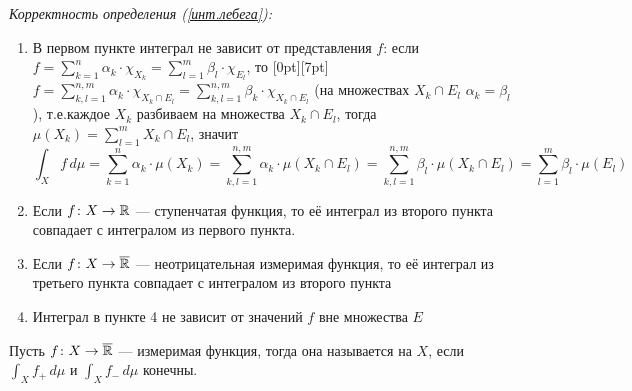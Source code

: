 \begin{zam} \textit{Корректность определения (\ref{инт.лебега}): } 
	\begin{enumerate}\makeatletter\renewcommand{\p@enumi}{\thezam.}\makeatother
		\item В первом пункте интеграл не зависит от представления $f$: если $f = \sum\limits_{k = 1}^n \alpha_k \cdot \chi_{X_k} = \sum\limits_{l = 1}^m \beta_l \cdot \chi_{E_l}$, то \raisebox{0pt}[0pt][7pt]{$f = \sum\limits_{k, l = 1}^{n, m} \alpha_k \cdot \chi_{X_k \cap E_l} = \sum\limits_{k, l = 1}^{n, m} \beta_k \cdot \chi_{X_k \cap E_l}$} (на множествах $X_k \cap E_l$ $\alpha_k = \beta_l$), т.е.каждое $X_k$ разбиваем на множества $X_k \cap E_l$, тогда $\mu(X_k) = \sum\limits_{l = 1}^m X_k \cap E_l$, значит \[\int_X f\, d\mu = \sum\limits_{k = 1}^n \alpha_k \cdot \mu(X_k) = \sum\limits_{k, l = 1}^{n, m} \alpha_k \cdot \mu(X_k \cap E_l) = \sum\limits_{k, l = 1}^{n, m} \beta_l \cdot \mu(X_k \cap E_l) = \sum\limits_{l = 1}^m \beta_l \cdot \mu(E_l)\]
		
		\item\label{мон.инт.ступ.} Если $f \colon X \to \mathbb R$ --- ступенчатая функция, то её интеграл из второго пункта совпадает с интегралом из первого пункта. 
		
		\item Если $f \colon X \to \overline{\mathbb R}$ --- неотрицательная измеримая функция, то её интеграл из третьего пункта совпадает с интегралом из второго пункта 
		
		\item Интеграл в пункте 4 не зависит от значений $f$ вне множества $E$
	\end{enumerate}
\end{zam}

\begin{opr}\label{сумм.ф.}
	Пусть $f \colon X \to \overline {\mathbb R}$ --- измеримая функция, тогда она называется  на $X$, если $\int_X f_+ \,d\mu$ и $\int_X f_- \, d\mu$ конечны.
\end{opr}


